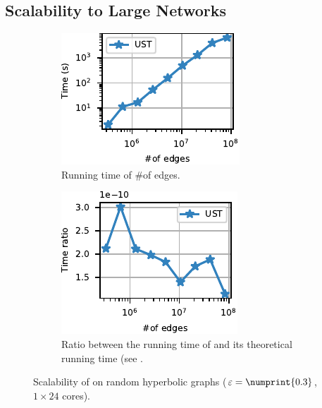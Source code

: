 \subsection{Scalability to Large Networks}
\begin{figure}[tb]
\centering
\begin{subfigure}[t]{.45\textwidth}
\centering
\includegraphics[width=.7\textwidth]{sources/plots/el-clos/hyp-scalability.pdf}
\caption{Running time of \ust \wrt \#of edges.}
\label{fig:el-clos:hyp-running-time}
\end{subfigure}\hfill
\begin{subfigure}[t]{.45\textwidth}
\centering
\includegraphics[width=.7\textwidth]{sources/plots/el-clos/hyp-theoretical-scalability.pdf}
\caption{Ratio between the running time of \ust and its theoretical running
time (see .}
\label{fig:el-clos:hyp-theo-running-time}
\end{subfigure}
\caption{Scalability of \ust on random hyperbolic graphs ($\epsilon = \numprint{0.3}$,
$1\times 24$ cores).}
\end{figure}

